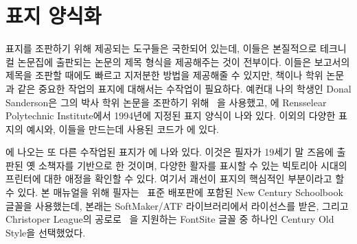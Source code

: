 \section{표지 양식화}



표지를 조판하기 위해 제공되는 도구들은 국한되어 있는데, 이들은 본질적으로
테크니컬 논문집에 출판되는 논문의 제목 형식을 제공해주는 것이 전부이다.
이들은 보고서의 제목을 조판할 때에도 빠르고 지저분한 방법을 제공해줄 수 있지만,
책이나 학위 논문과 같은 중요한 작업의 표지에 대해서는
수작업이 필요하다.
예컨대 나의 학생인 Donal Sanderson은 그의 박사 학위 논문을 조판하기 위해
\ltx\ 을 사용했고, 에 Rensselear Polytechnic
Institute에서 1994년에 지정된 표지 양식이 나와 있다.
이외의 다양한 표지의 예시와, 이들을 만드는데 사용된 코드가 \cite{TITLEPAGES}에
있다.

\cite{TITLEPAGES}에 나오는 또 다른 수작업된 표지가
에 나와 있다.
이것은 필자가 19세기 말 즈음에 출판된 옛 소책자를 기반으로 한 것이며, 다양한
활자를 표시할 수 있는 빅토리아 시대의 프린터에 대한 애정을 확인할 수 있다.
여기서 괘선이 표지의 핵심적인 부분이라고 할 수 있다.
본 매뉴얼을 위해 필자는 \ltx\ 표준 배포판에 포함된 New Century Schoolbook
글꼴을 사용했는데, 본래는 SoftMaker/ATF 라이브러리에서 라이선스를 받은, 그리고 
Christoper League의 공로\cite{TEXFONTSITE}로 \ltx\ 을
지원하는 FontSite 글꼴 중 하나인 Century Old
Style을 선택했었다.

